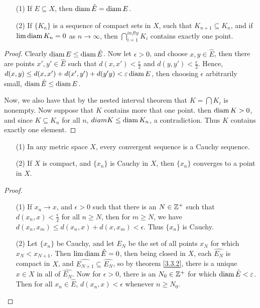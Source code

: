 \begin{theorem}\label{3.3.2}
    \begin{enumerate}
        \item[(1)] If $E \subseteq X$, then  $\operatorname{diam}{\hat{E}}=\operatorname{diam}{E}$.

        \item[(2)] If $\{K_n\}$ is a sequence of compact sets in  $X$, such that  $K_{n+1} \subseteq K_n$, and
            if  $\lim{\operatorname{diam}{K_n}}=0$ as  $n \rightarrow \infty$, then  $\bigcap_{i=1}^{infty}{K_i}$ contains
            exactly one point.
    \end{enumerate}
\end{theorem}
\begin{proof}
    Clearly $\operatorname{diam}{E} \leq \operatorname{diam}{\hat{E}}$. Now let  $\epsilon>0$, and choose  $x,y \in \hat{E}$, then
    there are points $x',y' \in \hat{E}$ such that  $d(x,x')<\frac{\epsilon}{2}$ and $d(y,y')<
    \frac{\epsilon}{2}$. Hence, $d(x,y) \leq d(x,x')+d(x',y')+d(y'y)<\varepsilon \operatorname{diam}{E}$, then
    choosing  $\epsilon$ arbitrarily small,  $\operatorname{diam}{\hat{E}} \leq \operatorname{diam}{E}$.

    Now, we also have that by the nested interval theorem that $K=\bigcap{K_i}$ is nonempty. Now
    suppose that  $K$ contains more that one point. then $\operatorname{diam}{K}>0$, and since  $K \subseteq K_n$ for
    all  $n$,  $diam{K} \leq \operatorname{diam}{K_n}$, a contradiction. Thus  $K$ contains exactly one element.
\end{proof}

\begin{theorem}\label{3.3.3}
    \begin{enumerate}
        \item[(1)] In any metric space $X$, every convergent sequence is a Cauchy sequence.

        \item[(2)] If $X$ is compact, and  $\{x_n\}$ is Cauchy in  $X$, then $\{x_n\}$
            converges to a point in  $X$.
    \end{enumerate}
\end{theorem}
\begin{proof}
    \begin{enumerate}
        \item[(1)] If $x_n \rightarrow x$, and $\epsilon>0$ such that there is an  $N \in \mathbb{Z}^+$ such that
            $d(x_n,x)<\frac{\epsilon}{2}$ for all $n \geq N$, then for  $m \geq N$, we have
            $d(x_n,x_m) \leq d(x_n,x)+d(x,x_m)<\epsilon$. Thus  $\{x_n\}$ is Cauchy.

        \item[(2)] Let $\{x_n\}$ be Cauchy, and let  $E_N$ be the set of all points  $x_N$ for
            which  $x_N<x_{N+1}$. Then  $\lim{\operatorname{diam}{\hat{E}}}=0$, then being closed in  $X$, each
            $\hat{E_N}$ is compact in  $X$, and  $\hat{E_{N+1}} \subseteq \hat{E_N}$, so
            by theorem \ref{3.3.2}, there is a unique  $x \in X$ in all of $\hat{E_N}$. Now for
            $\epsilon>0$, there is an  $N_0 \in \mathbb{Z}^+$ for which $\operatorname{diam}{\hat{E}}<\varepsilon$. Then for all
            $x_n \in \hat{E}$,  $d(x_n,x)<\epsilon$ whenever  $n \geq N_0$.
    \end{enumerate}
\end{proof}

